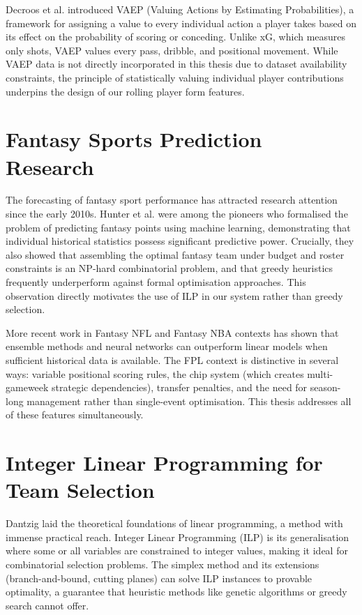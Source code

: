 Decroos et al. \cite{decroos2019vaep} introduced VAEP (Valuing Actions by Estimating Probabilities), a framework for assigning a value to every individual action a player takes based on its effect on the probability of scoring or conceding. Unlike xG, which measures only shots, VAEP values every pass, dribble, and positional movement. While VAEP data is not directly incorporated in this thesis due to dataset availability constraints, the principle of statistically valuing individual player contributions underpins the design of our rolling player form features.

\section{Fantasy Sports Prediction Research}

The forecasting of fantasy sport performance has attracted research attention since the early 2010s. Hunter et al. \cite{hunter2012fantasy} were among the pioneers who formalised the problem of predicting fantasy points using machine learning, demonstrating that individual historical statistics possess significant predictive power. Crucially, they also showed that assembling the optimal fantasy team under budget and roster constraints is an NP-hard combinatorial problem, and that greedy heuristics frequently underperform against formal optimisation approaches. This observation directly motivates the use of ILP in our system rather than greedy selection.

More recent work in Fantasy NFL and Fantasy NBA contexts has shown that ensemble methods and neural networks can outperform linear models when sufficient historical data is available. The FPL context is distinctive in several ways: variable positional scoring rules, the chip system (which creates multi-gameweek strategic dependencies), transfer penalties, and the need for season-long management rather than single-event optimisation. This thesis addresses all of these features simultaneously.

\section{Integer Linear Programming for Team Selection}

Dantzig \cite{dantzig1963linear_programming} laid the theoretical foundations of linear programming, a method with immense practical reach. Integer Linear Programming (ILP) is its generalisation where some or all variables are constrained to integer values, making it ideal for combinatorial selection problems. The simplex method and its extensions (branch-and-bound, cutting planes) can solve ILP instances to provable optimality, a guarantee that heuristic methods like genetic algorithms or greedy search cannot offer.

